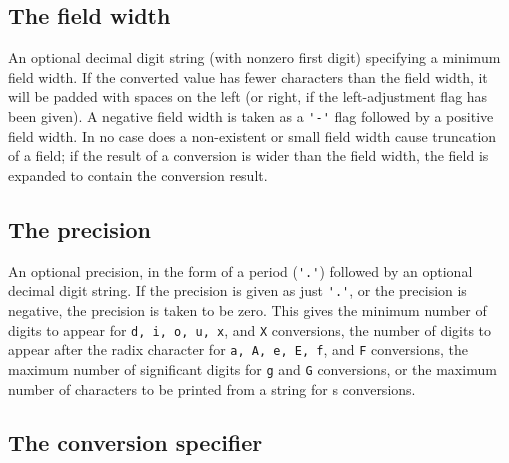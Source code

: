 \subsection{The field width}

An  optional decimal digit string (with nonzero first digit) specifying a 
minimum field width.  If the converted  value  has  fewer  characters than 
the  field  width,  it will be padded with spaces on the left (or right, 
if the left-adjustment flag has been given).  A  negative  field width is 
taken as a \verb|'-'| flag followed by a positive field  width. In no case does 
a non-existent or small field width cause truncation of a field; if the 
result of a conversion is wider than the  field  width, the field is 
expanded to contain the conversion result.

\subsection{The precision}


An  optional  precision,  in the form of a period (\verb|'.'|)  followed by an optional decimal digit string.  If the precision is given as just \verb|'.'|, or the precision is negative, the precision is  taken  to  be zero.   This  gives the minimum number of digits to appear for \verb|d, i, o, u, x|, and \verb|X| conversions, the number of digits to appear after the radix character  for  \verb|a, A, e, E, f|, and \verb|F| conversions, the maximum number of significant digits for \verb|g| and \verb|G| conversions, or the  maximum  number  of  characters to be printed from a string for s conversions.

\subsection{The conversion specifier}


